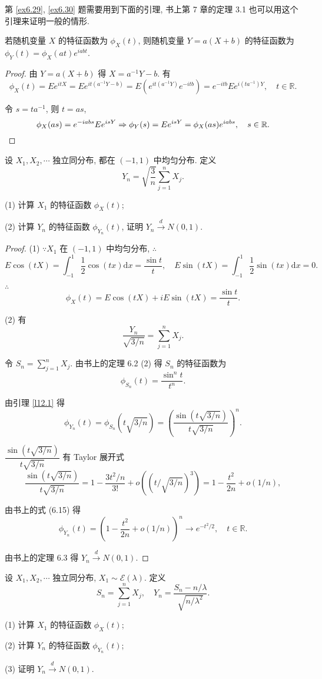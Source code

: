 \documentclass{ctexart}
\begin{document}
第 \ref{ex6.29}, \ref{ex6.30} 题需要用到下面的引理, 书上第 7 章的定理 3.1 也可以用这个引理来证明一般的情形.
\begin{lemma}\label{l12.1}
    若随机变量 $X$ 的特征函数为 $\phi_X(t)$, 则随机变量 $Y=a(X+b)$ 的特征函数为 $\phi_Y(t)=\phi_X(at)e^{iabt}$.
\end{lemma}
\begin{proof}
    由 $Y=a(X+b)$ 得 $X=a^{-1}Y-b$. 有
    \[\phi_X(t)=Ee^{itX}=Ee^{it(a^{-1}Y-b)}=E(e^{it(a^{-1}Y)}e^{-itb})=e^{-itb}Ee^{i(ta^{-1})Y},\quad t\in\mathbb{R}.\]

    令 $s=ta^{-1}$, 则 $t=as$,
    \[\phi_X(as)=e^{-iabs}Ee^{isY}\Rightarrow\phi_Y(s)=Ee^{isY}=\phi_X(as)e^{iabs},\quad s\in\mathbb{R}.\qedhere\]
\end{proof}
\begin{exercise}\label{ex6.29}
    设 $X_1,X_2,\cdots$ 独立同分布, 都在 $(-1,1)$ 中均匀分布. 定义
    \[Y_n=\sqrt{\dfrac{3}{n}}\sum\limits_{j=1}^nX_j.\]

    (1) 计算 $X_1$ 的特征函数 $\phi_X(t)$;

    (2) 计算 $Y_n$ 的特征函数 $\phi_{Y_n}(t)$, 证明 $Y_n\xrightarrow{d}N(0,1)$.
\end{exercise}
\begin{proof}
    (1) $\because X_1$ 在 $(-1,1)$ 中均匀分布, $\therefore$
    \[E\cos(tX)=\int_{-1}^1\dfrac{1}{2}\cos(tx)\mathrm{d}x=\dfrac{\sin t}{t},\quad E\sin(tX)=\int_{-1}^1\dfrac{1}{2}\sin(tx)\mathrm{d}x=0.\]

    $\therefore$
    \[\phi_X(t)=E\cos(tX)+iE\sin(tX)=\dfrac{\sin t}{t}.\]

    (2) 有
    \[\dfrac{Y_n}{\sqrt{3/n}}=\sum\limits_{j=1}^nX_j.\]

    令 $S_n=\sum\limits_{j=1}^nX_j$. 由书上的定理 6.2 (2) 得 $S_n$ 的特征函数为
    \[\phi_{S_n}(t)=\dfrac{\sin^nt}{t^n}.\]

    由引理 \ref{l12.1} 得
    \[\phi_{Y_n}(t)=\phi_{S_n}(t\sqrt{3/n})=\left(\dfrac{\sin(t\sqrt{3/n})}{t\sqrt{3/n}}\right)^n.\]

    $\dfrac{\sin(t\sqrt{3/n})}{t\sqrt{3/n}}$ 有 Taylor 展开式
    \[\dfrac{\sin(t\sqrt{3/n})}{t\sqrt{3/n}}=1-\dfrac{3t^2/n}{3!}+o((t/\sqrt{3/n})^3)=1-\dfrac{t^2}{2n}+o(1/n),\]

    由书上的式 (6.15) 得
    \[\phi_{Y_n}(t)=\left(1-\dfrac{t^2}{2n}+o(1/n)\right)^n\to e^{-t^2/2},\quad t\in\mathbb{R}.\]

    由书上的定理 6.3 得 $Y_n\xrightarrow{d}N(0,1)$.
\end{proof}
\begin{exercise}\label{ex6.30}
    设 $X_1,X_2,\cdots$ 独立同分布, $X_1\sim\mathcal{E}(\lambda)$. 定义
    \[S_n=\sum\limits_{j=1}^nX_j,\quad Y_n=\dfrac{S_n-n/\lambda}{\sqrt{n/\lambda^2}}.\]

    (1) 计算 $X_1$ 的特征函数 $\phi_X(t)$;

    (2) 计算 $Y_n$ 的特征函数 $\phi_{Y_n}(t)$;

    (3) 证明 $Y_n\xrightarrow{d}N(0,1)$.
\end{exercise}
\end{document}
